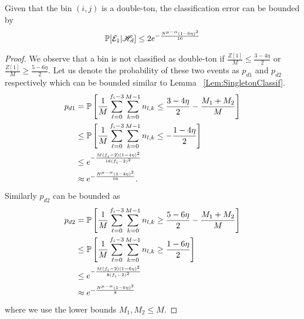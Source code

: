 \begin{lemma}
\label{Lem:DoubletonClassif}
Given that the bin $(i,j)$ is a double-ton, the classification error can be bounded by
\begin{align*}
\mathbb{P}[\mathcal{E}_1|\mathscr{H}_d]\leq 2e^{-\frac{N^{\mu-\alpha}(1-6\eta)^2}{16}}
\end{align*}
\end{lemma}
\begin{proof}
We observe that a bin is not classified as double-ton if $\frac{Z[1]}{M}\leq\frac{3-4\eta}{2}$ or $\frac{Z[1]}{M}\geq\frac{5-6\eta}{2}$. Let us denote the probability of these two events as $p_{d1}$ and $p_{d2}$ respectively which can be bounded similar to Lemma ~\ref{Lem:SingletonClassif}.
\begin{align*}
p_{d1}&=\mathbb{P}\left[\frac{1}{M}\sum\limits_{\ell=0}^{f_{i}-3}\sum\limits_{k=0}^{M-1} n_{l,k}\leq\frac{3-4\eta}{2}-\frac{M_1+M_2}{M}\right]\\
&\leq \mathbb{P}\left[\frac{1}{M}\sum\limits_{\ell=0}^{f_{i}-3}\sum\limits_{k=0}^{M-1} n_{l,k}\leq-\frac{1-4\eta}{2}\right]\\
&\leq e^{-\frac{M(f_i-2)(1-4\eta)^2}{16(f_i-2)^{2}}}\\
&\approx e^{-\frac{N^{\mu-\alpha}(1-4\eta)^2}{16}}.
\end{align*} 
Similarly $p_{d2}$ can be bounded as 
\begin{align*}
p_{d2}&=\mathbb{P}\left[\frac{1}{M}\sum\limits_{\ell=0}^{f_{i}-3}\sum\limits_{k=0}^{M-1} n_{l,k}\geq\frac{5-6\eta}{2}-\frac{M_1+M_2}{M}\right]\\
&\leq \mathbb{P}\left[\frac{1}{M}\sum\limits_{\ell=0}^{f_{i}-3}\sum\limits_{k=0}^{M-1} n_{l,k}\geq\frac{1-6\eta}{2}\right]\\
&\leq e^{-\frac{M(f_i-2)(1-6\eta)^2}{8(f_i-2)^{2}}}\\
&\approx e^{-\frac{N^{\mu-\alpha}(1-6\eta)^2}{8}}
\end{align*} 
where we use the lower bounds $M_1,M_2\leq M$.
\end{proof}

